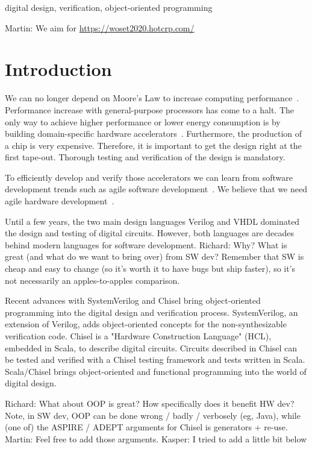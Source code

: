 \documentclass[conference]{IEEEtran}
\newcommand{\martin}[1]{{\color{blue} Martin: #1}}
\newcommand{\ducky}[1]{{\color{orange} Richard: #1}}
\newcommand{\kasper}[1]{{\color{purple} Kasper: #1}}
\begin{document}
\begin{IEEEkeywords}
digital design, verification, object-oriented programming
\end{IEEEkeywords}

\martin{We aim for \url{https://woset2020.hotcrp.com/}}

\section{Introduction}
\label{sec:intro}


We can no longer depend on Moore's Law to increase computing performance~\cite{dark-silicon:2011}.
Performance increase with general-purpose processors has come to a halt.
The only way to achieve higher performance or lower energy consumption
is by building domain-specific hardware accelerators~\cite{domain-hw-acc:2020}.
Furthermore, the production of a chip is very expensive. Therefore, it is important to get the design right at the first tape-out. Thorough testing and verification of the design is mandatory.

To efficiently develop and verify those accelerators we can learn from software development trends such as agile software development~\cite{agile:manifesto}.
We believe that we need agile hardware development~\cite{henn-patt:turing:2019}.

Until a few years, the two main design languages Verilog and VHDL dominated the
design and testing of digital circuits. However, both languages are decades behind
modern languages for software development. \ducky{Why? What is great (and what do we want to bring over) from SW dev? Remember that SW is cheap and easy to change (so it's worth it to have bugs but ship faster), so it's not necessarily an apples-to-apples comparison.}

Recent advances with SystemVerilog and Chisel bring object-oriented programming
into the digital design and verification process. SystemVerilog, an extension of Verilog, adds object-oriented concepts for the non-synthesizable verification code.
Chisel is a "Hardware Construction Language" (HCL), embedded in Scala, to describe digital circuits.
Circuits described in Chisel can be tested and verified with a Chisel testing
framework and tests written in Scala.
Scala/Chisel brings object-oriented and functional programming into the world of
digital design.

\ducky{What about OOP is great? How specifically does it benefit HW dev? Note, in SW dev, OOP can be done wrong / badly / verbosely (eg, Java), while (one of) the ASPIRE / ADEPT arguments for Chisel is generators + re-use.}
\martin{Feel free to add those arguments.}
\kasper{I tried to add a little bit below}
\end{document}
